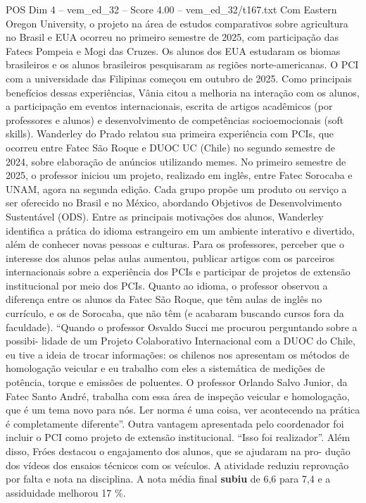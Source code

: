 \begin{textsample}{POS Dim 4 – vem\_ed\_32 – Score 4.00 – vem\_ed\_32/t167.txt}
Com Eastern Oregon University, o projeto na área de estudos comparativos sobre agricultura no Brasil e EUA ocorreu no primeiro semestre de 2025, com participação das Fatecs Pompeia e Mogi das Cruzes.
Os alunos dos EUA estudaram os biomas brasileiros e os alunos brasileiros pesquisaram as regiões norte-americanas.
O PCI com a universidade das Filipinas começou em outubro de 2025.
Como principais benefícios dessas experiências, Vânia citou a melhoria na interação com os alunos, a participação em eventos internacionais, escrita de artigos acadêmicos (por professores e alunos) e desenvolvimento de competências socioemocionais (soft skills).
Wanderley do Prado relatou sua primeira experiência com PCIs, que ocorreu entre Fatec São Roque e DUOC UC (Chile) no segundo semestre de 2024, sobre elaboração de anúncios utilizando memes.
No primeiro semestre de 2025, o professor iniciou um projeto, realizado em inglês, entre Fatec Sorocaba e UNAM, agora na segunda edição.
Cada grupo propõe um produto ou serviço a ser oferecido no Brasil e no México, abordando Objetivos de Desenvolvimento Sustentável (ODS).
Entre as principais motivações dos alunos, Wanderley identifica a prática do idioma estrangeiro em um ambiente interativo e divertido, além de conhecer novas pessoas e culturas.
Para os professores, perceber que o interesse dos alunos pelas aulas aumentou, publicar artigos com os parceiros internacionais sobre a experiência dos PCIs e participar de projetos de extensão institucional por meio dos PCIs.
Quanto ao idioma, o professor observou a diferença entre os alunos da Fatec São Roque, que têm aulas de inglês no currículo, e os de Sorocaba, que não têm (e acabaram buscando cursos fora da faculdade). “Quando o professor Osvaldo Succi me procurou perguntando sobre a possibi- lidade de um Projeto Colaborativo Internacional com a DUOC do Chile, eu tive a ideia de trocar informações: os chilenos nos apresentam os métodos de homologação veicular e eu trabalho com eles a sistemática de medições de potência, torque e emissões de poluentes.
O professor Orlando Salvo Junior, da Fatec Santo André, trabalha com essa área de inspeção veicular e homologação, que é um tema novo para nós.
Ler norma é uma coisa, ver acontecendo na prática é completamente diferente”.
Outra vantagem apresentada pelo coordenador foi incluir o PCI como projeto de extensão institucional. “Isso foi realizador”.
Além disso, Fróes destacou o engajamento dos alunos, que se ajudaram na pro- dução dos vídeos dos ensaios técnicos com os veículos.
A atividade reduziu reprovação por falta e nota na disciplina.
A nota média final \textbf{subiu} de 6,6 para 7,4 e a assiduidade melhorou 17 \%.

\end{textsample}
